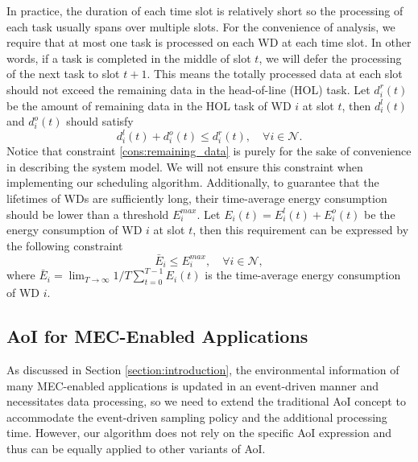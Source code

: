 \documentclass[lettersize, journal]{IEEEtran}
\begin{document}
In practice, the duration of each time slot is relatively short so the processing of each task usually spans over multiple slots.
For the convenience of analysis, we require that at most one task is processed on each WD at each time slot.
In other words, if a task is completed in the middle of slot $t$, we will defer the processing of the next task to slot $t+1$.
This means the totally processed data at each slot should not exceed the remaining data in the head-of-line (HOL) task.
Let $d^r_i(t)$ be the amount of remaining data in the HOL task of WD $i$ at slot $t$, then $d^l_i(t)$ and $d^o_i(t)$ should satisfy
\begin{equation}
    d^l_i(t) + d^o_i(t) \leq d^r_i(t), \quad \forall i\in\mathcal{N}. \label{cons:remaining_data}
\end{equation}
Notice that constraint \eqref{cons:remaining_data} is purely for the sake of convenience in describing the system model.
We will not ensure this constraint when implementing our scheduling algorithm.
Additionally, to guarantee that the lifetimes of WDs are sufficiently long, their time-average energy consumption should be lower than a threshold $E^{max}_i$.
Let $E_i(t) = E^l_i(t) + E^o_i(t)$ be the energy consumption of WD $i$ at slot $t$, then
this requirement can be expressed by the following constraint
\begin{equation}
    \bar{E}_i \leq E^{max}_i, \quad \forall i\in\mathcal{N}, \label{cons:energy}
\end{equation}
where $\bar{E}_i = \lim_{T\to\infty} 1/T \sum_{t=0}^{T-1} E_i(t)$ is the time-average energy consumption of WD $i$.


\subsection{AoI for MEC-Enabled Applications} \label{subsection:aoi}
As discussed in Section \ref{section:introduction},
the environmental information of many MEC-enabled applications is updated in an event-driven manner
and necessitates data processing, so we need to extend the traditional AoI concept to 
accommodate the event-driven sampling policy and the additional processing time.
However, our algorithm does not rely on the specific AoI expression and thus can be equally applied to other variants of AoI.
\end{document}
